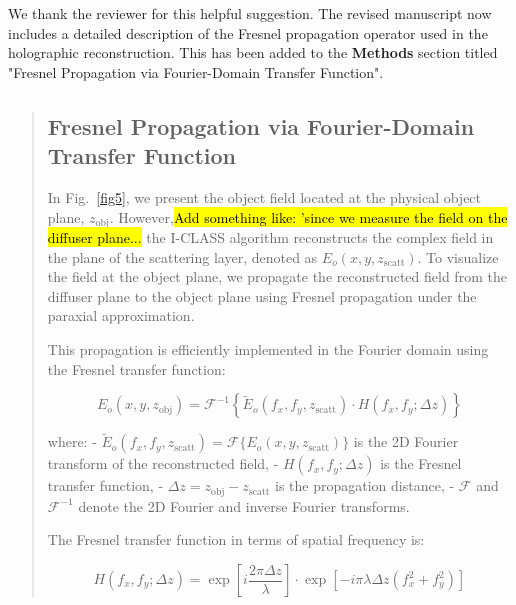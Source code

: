 \documentclass[12pt]{article}
\newcommand{\hlred}[1]{\sethlcolor{red!30}\hl{#1}}
\newenvironment{ourresponse}
    {\begin{tcolorbox}[width=\linewidth,breakable,enhanced,colback=gray!5,colframe=responsecolor!50,title=Response,left=5pt,right=5pt]}
    {\end{tcolorbox}}
\begin{document}
\begin{enumerate}[label=\arabic*.]
    

    \begin{ourresponse}
        We thank the reviewer for this helpful suggestion. The revised manuscript now includes a detailed description of the Fresnel propagation operator used in the holographic reconstruction. This has been added to the \textbf{Methods} section titled "Fresnel Propagation via Fourier-Domain Transfer Function".
        \begin{quote}
            \subsection*{Fresnel Propagation via Fourier-Domain Transfer Function}
            \label{Fresnel_propagation}
            In Fig.~\ref{fig5}, we present the object field located at the physical object plane, $z_{\text{obj}}$. However,\hlred{Add something like: 'since we measure the field on the diffuser plane...} the I-CLASS algorithm reconstructs the complex field in the plane of the scattering layer, denoted as $E_o(x, y, z_{\text{scatt}})$. To visualize the field at the object plane, we propagate the reconstructed field from the diffuser plane to the object plane using Fresnel propagation under the paraxial approximation.
            
            This propagation is efficiently implemented in the Fourier domain using the Fresnel transfer function:
            
            \begin{equation}
                E_o(x, y, z_{\text{obj}}) = \mathcal{F}^{-1} \left\{ \tilde{E}_o(f_x, f_y, z_{\text{scatt}}) \cdot H(f_x, f_y; \Delta z) \right\}
            \end{equation}
            
            where:
            - $ \tilde{E}_o(f_x, f_y, z_{\text{scatt}}) = \mathcal{F}\{ E_o(x, y, z_{\text{scatt}}) \} $ is the 2D Fourier transform of the reconstructed field,
            - $ H(f_x, f_y; \Delta z) $ is the Fresnel transfer function,
            - $ \Delta z = z_{\text{obj}} - z_{\text{scatt}} $ is the propagation distance,
            - $ \mathcal{F} $ and $ \mathcal{F}^{-1} $ denote the 2D Fourier and inverse Fourier transforms.
            
            The Fresnel transfer function in terms of spatial frequency is:
            
            \begin{equation}
                H(f_x, f_y; \Delta z) = \exp\left[ i \frac{2\pi \Delta z}{\lambda} \right] \cdot \exp\left[ -i \pi \lambda \Delta z (f_x^2 + f_y^2) \right]
            \end{equation}
            

\end{quote}
\end{ourresponse}
\end{enumerate}
\end{document}
